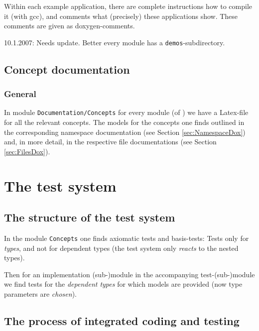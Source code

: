 \documentclass{book}
\begin{document}
Within each example application, there are complete instructions how to compile it (with gcc), and comments what (precisely) these applications show. These comments are given as doxygen-comments.

10.1.2007: Needs update. Better every module has a \texttt{demos}-subdirectory.



\chapter{Concept documentation}
\label{cha:LatexDocumentation}

\section{General}
\label{sec:LatexDocumentationGeneral}

In module \texttt{Documentation/Concepts} for every module (of \OKlibrary) we have a Latex-file for all the relevant concepts. The models for the concepts one finds outlined in the corresponding namespace documentation (see Section \ref{sec:NamespaceDox}) and, in more detail, in the respective file documentations (see Section \ref{sec:FilesDox}).


\part{The test system}
\label{par:TestingSystem}


\chapter{The structure of the test system}
\label{cha:structuretestsystem}

In the module \texttt{Concepts} one finds axiomatic tests and basis-tests: Tests only for \emph{types}, and not for dependent types (the test system only \emph{reacts} to the nested types).

Then for an implementation (sub-)module in the accompanying test-(sub-)module we find tests for the \emph{dependent types} for which models are provided (now type parameters are \emph{chosen}).



\chapter{The process of integrated coding and testing}
\label{cha:Integratedcondingtesting}
\end{document}
